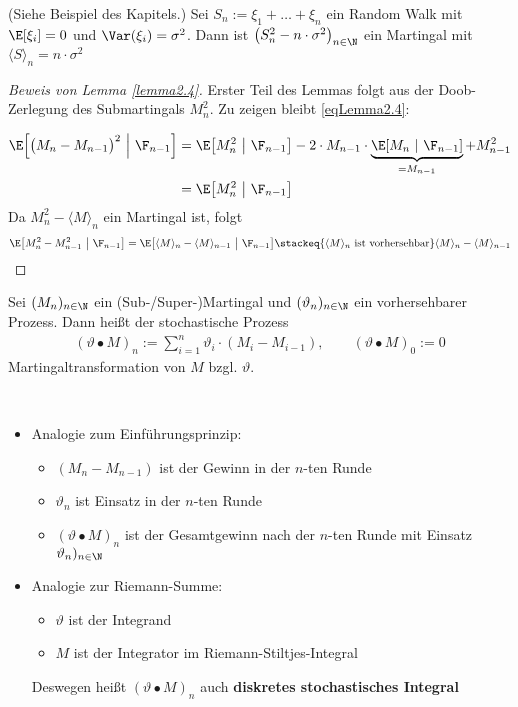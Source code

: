 \begin{beisp} %
(Siehe Beispiel des Kapitels.) Sei $S_n:=\xi_1+\ldots+\xi_n$ ein Random Walk mit $\E[\xi_i]=0$ und $\Var(\xi_i)=\sigma^2$. Dann ist
$\big(S_n^2-n\cdot\sigma^2\big)_{n\in\N}$ ein Martingal mit $\langle S\rangle_n=n\cdot\sigma^2$
\end{beisp}

\begin{proof}[Beweis von Lemma \ref{lemma2.4}]\enter
Erster Teil des Lemmas folgt aus der Doob-Zerlegung des Submartingals $M_n^2$. Zu zeigen bleibt \eqref{eqLemma2.4}:

\begin{align*}
\E\Big[\big(M_n-M_{n-1}\big)^2~\Big|~\F_{n-1}\Big]
&=\E\big[M_n^2~\big|~\F_{n-1}\big]-2\cdot M_{n-1}\cdot\underbrace{\E[M_n~|~\F_{n-1}]}_{=M_{n-1}}+M^2_{n-1}\\
&=\E\big[M_n^2~\big|~\F_{n-1}\big]
\end{align*}
Da $M_n^2-\langle M\rangle_n$ ein Martingal ist, folgt
\begin{align*}
\E\big[M_n^2-M_{n-1}^2~\big|~\F_{n-1}\big]
=\E\big[\langle M\rangle_n-\langle M\rangle_{n-1}~\big|~\F_{n-1}\big]
\stackeq{\langle M\rangle_n\text{ ist vorhersehbar}}\langle M\rangle_n-\langle M\rangle_{n-1}
\end{align*}
\end{proof}

\begin{defi} %
Sei $(M_n)_{n\in\N}$ ein (Sub-/Super-)Martingal und $(\vartheta_n)_{n\in\N}$ ein vorhersehbarer Prozess. Dann heißt der stochastische Prozess
\begin{align*}
(\vartheta\bullet M)_n:=\sum\limits_{i=1}^n\vartheta_i\cdot(M_i-M_{i-1}),\qquad(\vartheta\bullet M)_0:=0
\end{align*} 
Martingaltransformation von $M$ bzgl. $\vartheta$.
\end{defi}

\begin{bemerkung}\ %
\begin{itemize}
\item Analogie zum Einführungsprinzip:
\begin{itemize}
\item $(M_n-M_{n-1})$ ist der Gewinn in der $n$-ten Runde
\item $\vartheta_n$ ist Einsatz in der $n$-ten Runde
\item $(\vartheta\bullet M)_n$ ist der Gesamtgewinn nach der $n$-ten Runde mit Einsatz $\vartheta_n)_{n\in\N}$
\end{itemize}
\item Analogie zur Riemann-Summe:
\begin{itemize}
\item $\vartheta$ ist der Integrand
\item $M$ ist der Integrator im Riemann-Stiltjes-Integral
\end{itemize}
Deswegen heißt $(\vartheta\bullet M)_n$ auch \textbf{diskretes stochastisches Integral}
\end{itemize}
\end{bemerkung}

